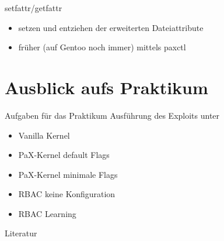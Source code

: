 \begin{frame}{setfattr/getfattr}
	\begin{itemize}
		\item setzen und entziehen der erweiterten Dateiattribute
		\item früher (auf Gentoo noch immer) mittels \glqq paxctl\grqq
	\end{itemize}
\end{frame}

\section{Ausblick aufs Praktikum}
\begin{frame}{Aufgaben für das Praktikum}
	Ausführung des Exploits unter
	\begin{itemize}
		\item Vanilla Kernel
		\item PaX-Kernel default Flags
		\item PaX-Kernel minimale Flags
		\item RBAC keine Konfiguration
		\item RBAC Learning
	\end{itemize}
\end{frame}

\begin{frame}{Literatur}
    
    
\end{frame}


